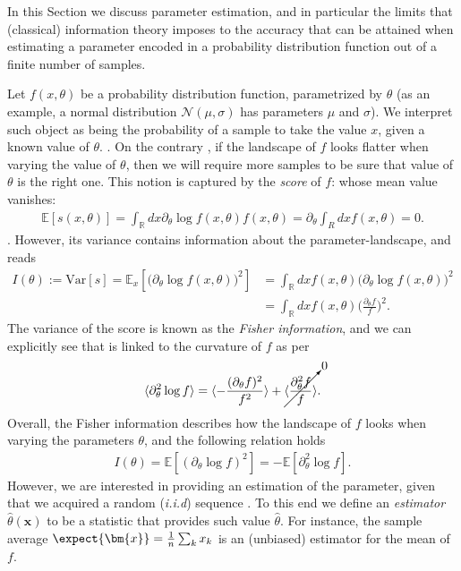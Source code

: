 In this Section we discuss parameter estimation, and in particular the limits that (classical) information theory imposes to the accuracy that can be attained when estimating a parameter encoded in a probability distribution function out of a finite number of samples.

Let $f(x, \theta)$ be a probability distribution function, parametrized by $\theta$ (as an example, a normal distribution $\mathcal{N}(\mu,\sigma)$ has parameters $\mu$ and $\sigma$). We interpret such object as being the probability of a sample to take the value $x$, given a known value of $\theta$. . On the contrary , if the landscape of $f$ looks flatter when varying the value of $\theta$, then we will require more samples to be sure that value of $\theta$ is the right one. This notion is captured by the \textit{score} of $f$:
whose mean value vanishes:
\begin{align*}
\mathbb{E}[s(x,\theta)] = \int_\mathbb{R} dx \partial_\theta \log f(x,\theta) f(x,\theta) = \partial_\theta \int_R dx f(x,\theta) = 0.
\end{align*}
.
However, its variance contains information about the parameter-landscape, and reads
\begin{align*}
I(\theta):= \text{Var}[s] = \mathbb{E}_x[\big(\partial_\theta \log f(x,\theta)\big)^2] &= \int_\mathbb{R} dx f(x,\theta) \big(\partial_\theta \log f(x,\theta)\big)^2 \\&= \int_\mathbb{R} dx f(x,\theta) \Big(\frac{\partial_\theta f}{f}\Big)^2.
\end{align*}
The variance of the score is known as the \textit{Fisher information}, and we can explicitly see that is linked to the curvature of $f$ as per
\begin{align*}
\langle\partial^2_\theta \log f \rangle = \langle - \frac{(\partial_\theta f)^2}{f^2}\rangle + \cancelto{0}{\langle \frac{\partial^2_\theta f}{f} \rangle}.
\end{align*}
Overall, the Fisher information describes how the landscape of $f$ looks when varying the parameters $\theta$, and the following relation holds
\begin{align}I(\theta) = \mathbb{E}[(\partial_\theta \log f)^2] = - \mathbb{E}[\partial^2_\theta \log f].\end{align}
However, we are interested in providing an estimation of the parameter, given that we acquired a random (\textit{i.i.d}) sequence . To this end we define an \textit{estimator} $\hat{\theta}(\bm{x})$ to be a statistic that provides such value $\hat{\theta}$. For instance, the sample average $\expect{\bm{x}} = \frac{1}{n}\sum_k x_k$ is an (unbiased) estimator for the mean of $f$.

